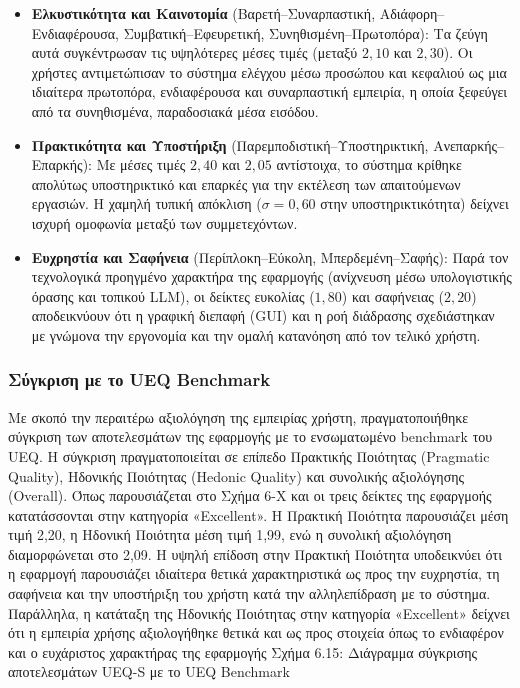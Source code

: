 \documentclass[twoside, a4paper, 11pt]{article}
\newcommand{\textlatin}[1]{\textenglish{#1}}
\begin{document}
\begin{itemize}
    \item \textbf{Ελκυστικότητα και Καινοτομία} (Βαρετή--Συναρπαστική, Αδιάφορη--Ενδιαφέρουσα, Συμβατική--Εφευρετική, Συνηθισμένη--Πρωτοπόρα): Τα ζεύγη αυτά συγκέντρωσαν τις υψηλότερες μέσες τιμές (μεταξύ $2,10$ και $2,30$). Οι χρήστες αντιμετώπισαν το σύστημα ελέγχου μέσω προσώπου και κεφαλιού ως μια ιδιαίτερα πρωτοπόρα, ενδιαφέρουσα και συναρπαστική εμπειρία, η οποία ξεφεύγει από τα συνηθισμένα, παραδοσιακά μέσα εισόδου.
    
    \item \textbf{Πρακτικότητα και Υποστήριξη} (Παρεμποδιστική--Υποστηρικτική, Ανεπαρκής--Επαρκής): Με μέσες τιμές $2,40$ και $2,05$ αντίστοιχα, το σύστημα κρίθηκε απολύτως υποστηρικτικό και επαρκές για την εκτέλεση των απαιτούμενων εργασιών. Η χαμηλή τυπική απόκλιση ($\sigma = 0,60$ στην υποστηρικτικότητα) δείχνει ισχυρή ομοφωνία μεταξύ των συμμετεχόντων.
    
    \item \textbf{Ευχρηστία και Σαφήνεια} (Περίπλοκη--Εύκολη, Μπερδεμένη--Σαφής): Παρά τον τεχνολογικά προηγμένο χαρακτήρα της εφαρμογής (ανίχνευση μέσω υπολογιστικής όρασης και τοπικού \textlatin{LLM}), οι δείκτες ευκολίας ($1,80$) και σαφήνειας ($2,20$) αποδεικνύουν ότι η γραφική διεπαφή (\textlatin{GUI}) και η ροή διάδρασης σχεδιάστηκαν με γνώμονα την εργονομία και την ομαλή κατανόηση από τον τελικό χρήστη.
\end{itemize}

\subsubsection{Σύγκριση με το UEQ Benchmark}
Με σκοπό την περαιτέρω αξιολόγηση της εμπειρίας χρήστη, πραγματοποιήθηκε σύγκριση των 
αποτελεσμάτων της εφαρμογής με το ενσωματωμένο benchmark του UEQ. Η σύγκριση 
πραγματοποιείται σε επίπεδο Πρακτικής Ποιότητας (Pragmatic Quality), Ηδονικής Ποιότητας 
(Hedonic Quality) και συνολικής αξιολόγησης (Overall). 
Όπως παρουσιάζεται στο Σχήμα 6-Χ και οι τρεις δείκτες της εφαργμοής κατατάσσονται στην κατηγορία
«Excellent». Η Πρακτική Ποιότητα παρουσιάζει μέση τιμή 2,20, η Ηδονική Ποιότητα μέση τιμή 1,99, 
ενώ η συνολική αξιολόγηση διαμορφώνεται στο 2,09. Η υψηλή επίδοση στην Πρακτική Ποιότητα 
υποδεικνύει ότι η εφαρμογή παρουσιάζει ιδιαίτερα θετικά χαρακτηριστικά ως προς την ευχρηστία, τη 
σαφήνεια και την υποστήριξη του χρήστη κατά την αλληλεπίδραση με το σύστημα. Παράλληλα, η 
κατάταξη της Ηδονικής Ποιότητας στην κατηγορία «Excellent» δείχνει ότι η εμπειρία χρήσης 
αξιολογήθηκε θετικά και ως προς στοιχεία όπως το ενδιαφέρον και ο ευχάριστος χαρακτήρας της 
εφαρμογής
Σχήμα 6.15: Διάγραμμα σύγκρισης αποτελεσμάτων UEQ-S με το UEQ Benchmark
\end{document}
